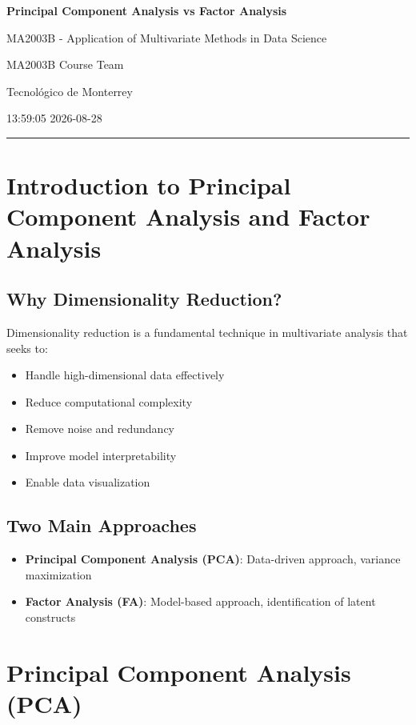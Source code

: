 \documentclass[
]{article}
\author{}
\date{}
\begin{document}
\textbf{Principal Component Analysis vs Factor Analysis}

MA2003B - Application of Multivariate Methods in Data Science

MA2003B Course Team

Tecnológico de Monterrey

13:59:05 2026-08-28

\begin{center}\rule{0.5\linewidth}{0.5pt}\end{center}

\section{Introduction to Principal Component Analysis and Factor
Analysis}

\subsection{Why Dimensionality Reduction?}

Dimensionality reduction is a fundamental technique in multivariate
analysis that seeks to:

\begin{itemize}
\item
  Handle high-dimensional data effectively
\item
  Reduce computational complexity
\item
  Remove noise and redundancy
\item
  Improve model interpretability
\item
  Enable data visualization
\end{itemize}

\subsection{Two Main Approaches}

\begin{itemize}
\item
  \textbf{Principal Component Analysis (PCA)}: Data-driven approach,
  variance maximization
\item
  \textbf{Factor Analysis (FA)}: Model-based approach, identification of
  latent constructs
\end{itemize}

\section{Principal Component Analysis (PCA)}
\end{document}
